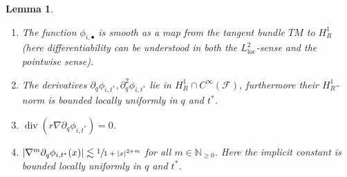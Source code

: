 \documentclass[10pt]{amsart}
\newcommand{\loc}{\mathrm{loc}}
\newcommand{\sbullet}{{\scriptscriptstyle\bullet}}
\newtheorem{lemma}[theorem]{Lemma}
\theoremstyle{definition}
\renewcommand{\div}{\operatorname{div}}
\newcommand\N{\mathbb{N}}
\let\de\partial
\begin{document}
\skpt
\begin{lemma}\label{SmoothnessInq}
\begin{enumerate}
\item\label{SmoothnessInqa} The function $\phi_{i,\sbullet}$ is smooth as a map from the tangent bundle $TM$ to $H_R^1$ (here differentiability can be understood in both the $L_{\loc}^2$-sense and the pointwise sense).
\item\label{SmoothnessInqb} The derivatives $\de_q \phi_{i,t^*},\de_q^2\phi_{i,t^*}$ lie in $H_R^1\cap C^\infty(\mathcal{F})$, furthermore their $H_{R}^1$-norm is bounded locally uniformly in $q$ and $t^*$.
\item\label{SmoothnessInqc} $\div(r\nabla\de_q \phi_{i,t^*})=0$.
\item\label{SmoothnessInqd}
$|\nabla^m\de_q\phi_{i,t^*}(x)|\lesssim \sfrac{1}{1+|x|^{2+m}}$ for all $m\in\N_{\geq 0}$.
Here the implicit constant is bounded locally uniformly in $q$ and $t^*$.
\end{enumerate}
\end{lemma}
\end{document}
